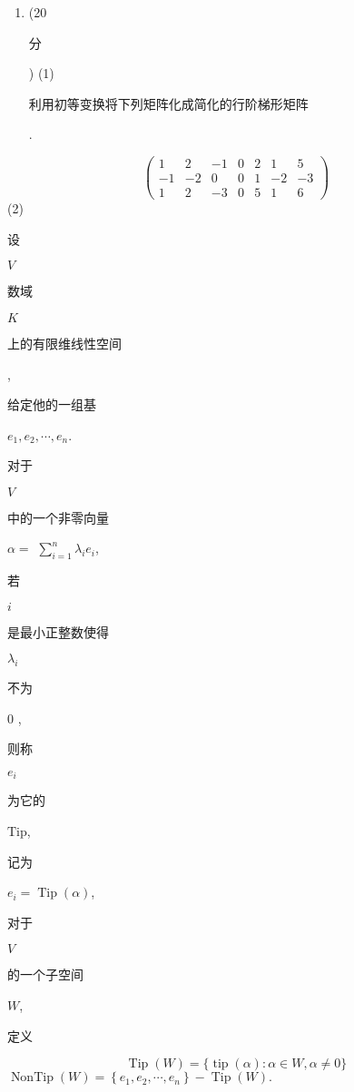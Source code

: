 \documentclass[10pt]{article}
\begin{document}
\begin{enumerate}
  \item (20 \begin{CJK}{UTF8}{mj}分\end{CJK}) (1) \begin{CJK}{UTF8}{mj}利用初等变换将下列矩阵化成简化的行阶梯形矩阵\end{CJK}.

\end{enumerate}
$$
\left(\begin{array}{ccccccc}
1 & 2 & -1 & 0 & 2 & 1 & 5 \\
-1 & -2 & 0 & 0 & 1 & -2 & -3 \\
1 & 2 & -3 & 0 & 5 & 1 & 6
\end{array}\right)
$$
(2) \begin{CJK}{UTF8}{mj}设\end{CJK} $V$ \begin{CJK}{UTF8}{mj}数域\end{CJK} $K$ \begin{CJK}{UTF8}{mj}上的有限维线性空间\end{CJK}, \begin{CJK}{UTF8}{mj}给定他的一组基\end{CJK} $e_{1}, e_{2}, \cdots, e_{n}$. \begin{CJK}{UTF8}{mj}对于\end{CJK} $V$ \begin{CJK}{UTF8}{mj}中的一个非零向量\end{CJK} $\alpha=$ $\sum_{i=1}^{n} \lambda_{i} e_{i}$, \begin{CJK}{UTF8}{mj}若\end{CJK} $i$ \begin{CJK}{UTF8}{mj}是最小正整数使得\end{CJK} $\lambda_{i}$ \begin{CJK}{UTF8}{mj}不为\end{CJK} 0 , \begin{CJK}{UTF8}{mj}则称\end{CJK} $e_{i}$ \begin{CJK}{UTF8}{mj}为它的\end{CJK} $\mathrm{Tip}$, \begin{CJK}{UTF8}{mj}记为\end{CJK} $e_{i}=\operatorname{Tip}(\alpha)$, \begin{CJK}{UTF8}{mj}对于\end{CJK} $V$ \begin{CJK}{UTF8}{mj}的一个子空间\end{CJK} $W$, \begin{CJK}{UTF8}{mj}定义\end{CJK}
$$
\operatorname{Tip}(W)=\{\operatorname{tip}(\alpha): \alpha \in W, \alpha \neq 0\}
$$
$\operatorname{NonTip}(W)=\left\{e_{1}, e_{2}, \cdots, e_{n}\right\}-\operatorname{Tip}(W) .$
\end{document}

